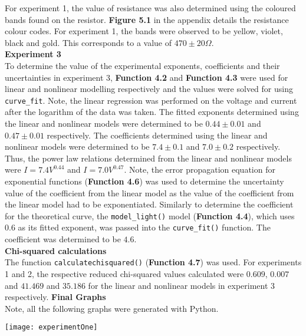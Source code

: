 \documentclass[
	letterpaper, %
	10pt, %
]{CSUniSchoolLabReport}
\begin{document}
For experiment 1, the value of resistance was also determined using the coloured bands found on the resistor. \textbf{Figure 5.1} in the
	appendix details the resistance colour codes. For experiment 1, the bands were observed to be yellow, violet, black and gold.
	This corresponds to a value of $470 \pm 20 \Omega$.
\vspace{5pt}\\
\textbf{Experiment 3}\\
To determine the value of the experimental exponents, coefficients and their uncertainties in experiment 3, \textbf{Function 4.2} and \textbf{Function 4.3}
	were used for linear and nonlinear modelling respectively and the values were solved for using \lstinline{curve_fit}.
	Note, the linear regression was performed on the voltage and current after the logarithm of the data was taken. The fitted exponents determined using
	the linear and nonlinear models were determined to be $0.44 \pm 0.01$
	and $0.47 \pm 0.01$ respectively. The coefficients determined using the linear and nonlinear models were determined to be $7.4 \pm 0.1$ and
	$7.0 \pm 0.2$ respectively. Thus, the power law relations determined from the linear and nonlinear models were $ I = 7.4 V ^ {0.44}$ and
	$I = 7.0 V ^{0.47}$. Note, the error propagation equation for exponential functions (\textbf{Function 4.6}) was used to determine the uncertainty value of the coefficient
	from the linear model as the value of the coefficient from the linear model had to be exponentiated. Similarly to determine the coefficient for the
	theoretical curve, the \lstinline{model_light()} model (\textbf{Function 4.4}), which uses $0.6$ as its fitted exponent, was passed into the \lstinline{curve_fit()} function.
	The coefficient was determined to be $4.6$.
{\vspace{10pt}}\\
{\large\textbf{Chi-squared calculations}}
{\vspace{5pt}}\\
The function \lstinline{calculatechisquared()} (\textbf{Function 4.7}) was used. For experiments 1 and 2, the respective reduced chi-squared values calculated were
	$0.609$, $0.007$ and $41.469$ and $35.186$ for the linear and nonlinear models in experiment 3 respectively.
\newpage
{\large\textbf{Final Graphs}}
{\vspace{5pt}}\\
Note, all the following graphs were generated with Python.\\
\begin{center}
	\texttt{[image: experimentOne]}
\end{center}
\end{document}
